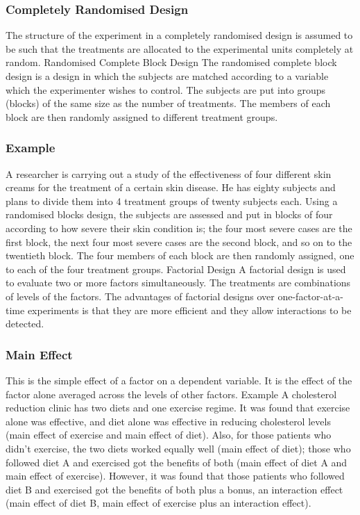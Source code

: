 \subsubsection*{Completely Randomised Design} 
The structure of the experiment in a completely randomised design is assumed to be such that the treatments are allocated to the experimental units completely at random.
Randomised Complete Block Design 
The randomised complete block design is a design in which the subjects are matched according to a variable which the experimenter wishes to control. The subjects are put into groups (blocks) of the same size as the number of treatments. The members of each block are then randomly assigned to different treatment groups.

\subsubsection*{Example}
A researcher is carrying out a study of the effectiveness of four different skin creams for the treatment of a certain skin disease. He has eighty subjects and plans to divide them into 4 treatment groups of twenty subjects each. Using a randomised blocks design, the subjects are assessed and put in blocks of four according to how severe their skin condition is; the four most severe cases are the first block, the next four most severe cases are the second block, and so on to the twentieth block. The four members of each block are then randomly assigned, one to each of the four treatment groups.
Factorial Design 
A factorial design is used to evaluate two or more factors simultaneously. The treatments are combinations of levels of the factors. The advantages of factorial designs over one-factor-at-a-time experiments is that they are more efficient and they allow interactions to be detected.
\subsubsection*{Main Effect}
This is the simple effect of a factor on a dependent variable. It is the effect of the factor alone averaged across the levels of other factors.
Example 
A cholesterol reduction clinic has two diets and one exercise regime. It was found that exercise alone was effective, and diet alone was effective in reducing cholesterol levels (main effect of exercise and main effect of diet). Also, for those patients who didn't exercise, the two diets worked equally well (main effect of diet); those who followed diet A and exercised got the benefits of both (main effect of diet A and main effect of exercise). However, it was found that those patients who followed diet B and exercised got the benefits of both plus a bonus, an interaction effect (main effect of diet B, main effect of exercise plus an interaction effect).
